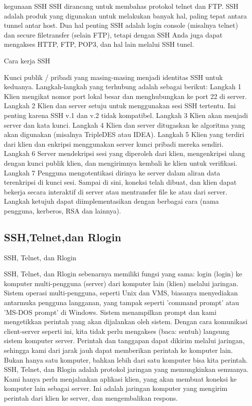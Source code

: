 kegunaan SSH
SSH dirancang untuk membahas protokol telnet dan FTP. SSH adalah produk yang digunakan untuk melakukan banyak hal, paling tepat antara tunnel antar host. Dua hal penting SSH adalah login console (misalnya telnet) dan secure filetransfer (selain FTP), tetapi dengan SSH Anda juga dapat mengakses HTTP, FTP, POP3, dan hal lain melalui SSH tunel.

Cara kerja SSH

Kunci publik / pribadi yang masing-masing menjadi identitas SSH untuk keduanya.
Langkah-langkah yang terhubung adalah sebagai berikut:
Langkah 1
Klien mengikat nomor port lokal besar dan menghubungkan ke port 22 di server.
Langkah 2
Klien dan server setuju untuk menggunakan sesi SSH tertentu. Ini penting karena SSH v.1 dan v.2 tidak kompatibel.
Langkah 3
Klien akan menjadi server dan kata kunci.
Langkah 4
Klien dan server ditugaskan ke algoritma yang akan digunakan (misalnya TripleDES atau IDEA).
Langkah 5
Klien yang terdiri dari klien dan enkripsi menggunakan server kunci pribadi mereka sendiri.
Langkah 6
Server mendekripsi sesi yang diperoleh dari klien, mengenkripsi ulang dengan kunci publik klien, dan mengirimnya kembali ke klien untuk verifikasi.
Langkah 7
Pengguna mengotentikasi dirinya ke server dalam aliran data terenkripsi di kunci sesi. Sampai di sini, koneksi telah dibuat, dan klien dapat bekerja secara interaktif di server atau mentransfer file ke atau dari server. Langkah ketujuh dapat diimplementasikan dengan berbagai cara (nama pengguna, kerberos, RSA dan lainnya).

\subsection {SSH,Telnet,dan Rlogin}

SSH, Telnet, dan Rlogin

SSH, Telnet, dan Rlogin sebenarnya memiliki fungsi yang sama: login (login) ke komputer multi-pengguna (server) dari komputer lain (klien) melalui jaringan. Sistem operasi multi-pengguna, seperti Unix dan VMS, biasanya menyediakan antarmuka pengguna langganan, yang tampak seperti 'command prompt' atau 'MS-DOS prompt' di Windows. Sistem menampilkan prompt dan kami mengetikkan perintah yang akan dijalankan oleh sistem.
Dengan cara komunikasi client-server seperti ini, kita tidak perlu mengakses (baca: sentuh) langsung sistem komputer server. Perintah dan tanggapan dapat dikirim melalui jaringan, sehingga kami dari jarak jauh dapat memberikan perintah ke komputer lain. Bukan hanya satu komputer, bahkan lebih dari satu komputer bisa kita perintah.
SSH, Telnet, dan Rlogin adalah protokol jaringan yang memungkinkan semuanya. Kami hanya perlu menjalankan aplikasi klien, yang akan membuat koneksi ke komputer lain sebagai server. Ini adalah jaringan komputer yang mengirim perintah dari klien ke server, dan mengembalikan respons.

